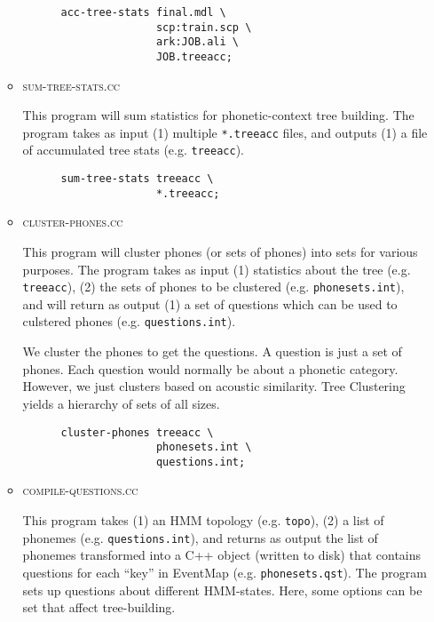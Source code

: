 \documentclass[10pt,a4paper]{article}
\begin{document}
\begin{itemize}
\begin{itemize}
    \begin{verbatim}
      acc-tree-stats final.mdl \
                     scp:train.scp \
                     ark:JOB.ali \
                     JOB.treeacc;
    \end{verbatim}



  \item \textsc{sum-tree-stats.cc}

    This program will sum statistics for phonetic-context tree building. The program takes as input (1) multiple \texttt{*.treeacc} files, and outputs (1) a file of accumulated tree stats (e.g. \texttt{treeacc}). 

    \begin{verbatim}
      sum-tree-stats treeacc \
                     *.treeacc;
    \end{verbatim}

  \item \textsc{cluster-phones.cc}
    
    This program will cluster phones (or sets of phones) into sets for various purposes. The program takes as input (1) statistics about the tree (e.g. \texttt{treeacc}), (2) the sets of phones to be clustered (e.g. \texttt{phonesets.int}), and will return as output (1) a set of questions which can be used to culstered phones (e.g. \texttt{questions.int}).

    We cluster the phones to get the questions. A question is just a set of phones. Each question would normally be about a phonetic category. However, we just clusters based on acoustic similarity. Tree Clustering yields a hierarchy of sets of all sizes.\\

    \begin{verbatim}
      cluster-phones treeacc \
                     phonesets.int \
                     questions.int;
    \end{verbatim}

  \item \textsc{compile-questions.cc}

    This program takes (1) an HMM topology (e.g. \texttt{topo}), (2) a list of phonemes (e.g. \texttt{questions.int}), and returns as output the list of phonemes transformed into a C++ object (written to disk) that contains questions for each “key” in EventMap (e.g. \texttt{phonesets.qst}). The program sets up questions about different HMM-states. Here, some options can be set that affect tree-building. \\


\end{itemize}
\end{itemize}
\end{document}
